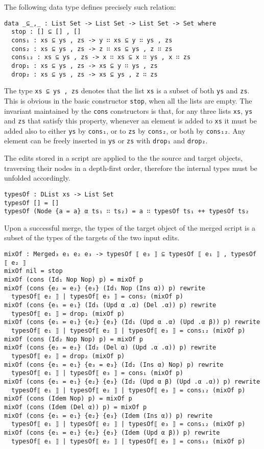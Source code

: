 \documentclass[../Thesis.tex]{subfiles}
\begin{document}
	The following data type defines precisely such relation:

\begin{verbatim}
data _⊆_,_ : List Set -> List Set -> List Set -> Set where
  stop : [] ⊆ [] , []
  cons₁ : xs ⊆ ys , zs -> y ∷ xs ⊆ y ∷ ys , zs
  cons₂ : xs ⊆ ys , zs -> z ∷ xs ⊆ ys , z ∷ zs
  cons₁₂ : xs ⊆ ys , zs -> x ∷ xs ⊆ x ∷ ys , x ∷ zs
  drop₁ : xs ⊆ ys , zs -> xs ⊆ y ∷ ys , zs
  drop₂ : xs ⊆ ys , zs -> xs ⊆ ys , z ∷ zs
\end{verbatim}

	The type \texttt{xs ⊆ ys , zs} denotes that the list \texttt{xs} is a subset
	of both \texttt{ys} and \texttt{zs}.
	This is obvious in the basic constructor \texttt{stop}, when all
	the lists are empty.
	The invariant maintained by the \texttt{cons} constructors is that, for any
	three lists \texttt{xs}, \texttt{ys} and \texttt{zs} that satisfy this property,
	 whenever an element is added to \texttt{xs} it must be added also 
	to either \texttt{ys} by \texttt{cons₁}, or  to \texttt{zs} by \texttt{cons₂},
	or both by \texttt{cons₁₂}.
	Any element can be freely inserted in \texttt{ys} or \texttt{zs} with 
	\texttt{drop₁} and \texttt{drop₂}.
	
	The edits stored in a script are applied to the the source and 
	target objects, traversing their nodes in a depth-first order, 
	therefore the internal types must be unfolded accordingly.
	
\begin{verbatim}
typesOf : DList xs -> List Set
typesOf [] = []
typesOf (Node {a = a} α ts₁ ∷ ts₂) = a ∷ typesOf ts₁ ++ typesOf ts₂
\end{verbatim}

	Upon a successful merge, the types of the target object of the merged script
	is a subset of the types of the targets of the two input edits.
\begin{verbatim}	
mixOf : Merged₃ e₁ e₂ e₃ -> typesOf ⟦ e₃ ⟧ ⊆ typesOf ⟦ e₁ ⟧ , typesOf ⟦ e₂ ⟧
mixOf nil = stop
mixOf (cons (Id₁ Nop Nop) p) = mixOf p
mixOf (cons {e₂ = e₂} {e₃} (Id₁ Nop (Ins α)) p) rewrite
  typesOf⟦ e₂ ⟧ | typesOf⟦ e₃ ⟧ = cons₂ (mixOf p)
mixOf (cons {e₁ = e₁} (Id₁ (Upd α .α) (Del .α)) p) rewrite
  typesOf⟦ e₁ ⟧ = drop₁ (mixOf p)
mixOf (cons {e₁ = e₁} {e₂} {e₃} (Id₁ (Upd α .α) (Upd .α β)) p) rewrite
  typesOf⟦ e₁ ⟧ | typesOf⟦ e₂ ⟧ | typesOf⟦ e₃ ⟧ = cons₁₂ (mixOf p)
mixOf (cons (Id₂ Nop Nop) p) = mixOf p
mixOf (cons {e₂ = e₂} (Id₂ (Del α) (Upd .α .α)) p) rewrite
  typesOf⟦ e₂ ⟧ = drop₂ (mixOf p)
mixOf (cons {e₁ = e₁} {e₃ = e₃} (Id₂ (Ins α) Nop) p) rewrite
  typesOf⟦ e₁ ⟧ | typesOf⟦ e₃ ⟧ = cons₁ (mixOf p)
mixOf (cons {e₁ = e₁} {e₂} {e₃} (Id₂ (Upd α β) (Upd .α .α)) p) rewrite
  typesOf⟦ e₁ ⟧ | typesOf⟦ e₂ ⟧ | typesOf⟦ e₃ ⟧ = cons₁₂ (mixOf p)
mixOf (cons (Idem Nop) p) = mixOf p
mixOf (cons (Idem (Del α)) p) = mixOf p
mixOf (cons {e₁ = e₁} {e₂} {e₃} (Idem (Ins α)) p) rewrite 
  typesOf⟦ e₁ ⟧ | typesOf⟦ e₂ ⟧ | typesOf⟦ e₃ ⟧ = cons₁₂ (mixOf p)
mixOf (cons {e₁ = e₁} {e₂} {e₃} (Idem (Upd α β)) p) rewrite 
  typesOf⟦ e₁ ⟧ | typesOf⟦ e₂ ⟧ | typesOf⟦ e₃ ⟧ = cons₁₂ (mixOf p)
\end{verbatim}
\end{document}
